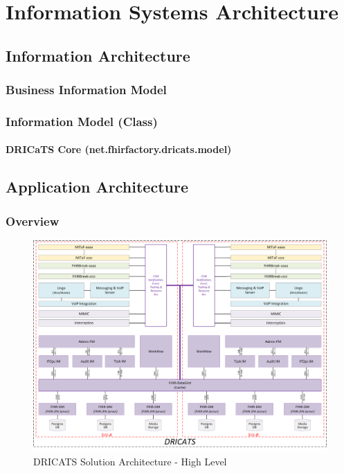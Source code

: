 \documentclass[a4paper]{book}
\begin{document}
\part{Information Systems Architecture}
\chapter{Information Architecture}

\section{Business Information Model}

\section{Information Model (Class)}

\subsection{DRICaTS Core (net.fhirfactory.dricats.model)}

\chapter{Application Architecture}
\section{Overview}

\begin{figure}[h!]
	\begin{adjustbox}{max size={0.98\textwidth}{0.9\textheight}, center}
		\includegraphics[]{diagrams/DRICATS-DesignOverview.png}
	\end{adjustbox}
	\caption{DRICATS Solution Architecture - High Level}
\end{figure}
\end{document}
